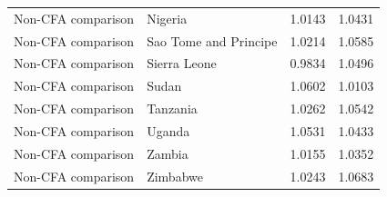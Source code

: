 \begin{table}
\begin{tabular}[t]{llrr}
Non-CFA comparison & Nigeria & 1.0143 & 1.0431\\
Non-CFA comparison & Sao Tome and Principe & 1.0214 & 1.0585\\
Non-CFA comparison & Sierra Leone & 0.9834 & 1.0496\\
\addlinespace
Non-CFA comparison & Sudan & 1.0602 & 1.0103\\
Non-CFA comparison & Tanzania & 1.0262 & 1.0542\\
Non-CFA comparison & Uganda & 1.0531 & 1.0433\\
Non-CFA comparison & Zambia & 1.0155 & 1.0352\\
Non-CFA comparison & Zimbabwe & 1.0243 & 1.0683\\
\bottomrule
\end{tabular}
\end{table}